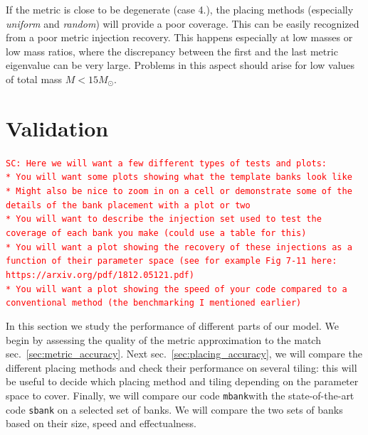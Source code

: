 \documentclass[twocolumn,showpacs,preprintnumbers,nofootinbib,prd,
superscriptaddress,10pt]{revtex4-2}
\newcommand{\mbank}{\texttt{mbank}}
\newcommand{\sarah}[1]{{\textcolor{red}{\texttt{SC: #1}} }}
\begin{document}
If the metric is close to be degenerate (case 4.), the placing methods (especially {\it uniform} and {\it random}) will provide a poor coverage. This can be easily recognized from a poor metric injection recovery. This happens especially at low masses or low mass ratios, where the discrepancy between the first and the last metric eigenvalue can be very large. Problems in this aspect should arise for low values of total mass $M<15 M_{\odot}$.

\section{Validation} \label{sec:validation}

\sarah{Here we will want a few different types of tests and plots:\\
* You will want some plots showing what the template banks look like\\
* Might also be nice to zoom in on a cell or demonstrate some of the details of the bank placement with a plot or two\\
* You will want to describe the injection set used to test the coverage of each bank you make (could use a table for this)\\
* You will want a plot showing the recovery of these injections as a function of their parameter space (see for example Fig 7-11 here: https://arxiv.org/pdf/1812.05121.pdf)\\
* You will want a plot showing the speed of your code compared to a conventional method (the benchmarking I mentioned earlier) \\
}

In this section we study the performance of different parts of our model. We begin by assessing the quality of the metric approximation to the match sec.~\ref{sec:metric_accuracy}.
Next sec.~\ref{sec:placing_accuracy}, we will compare the different placing methods and check their performance on several tiling: this will be useful to decide which placing method and tiling depending on the parameter space to cover.
Finally, we will compare our code \mbank with the state-of-the-art code \texttt{sbank} \cite{sbank} on a selected set of banks. We will compare the two sets of banks based on their size, speed and effectualness.
\end{document}
